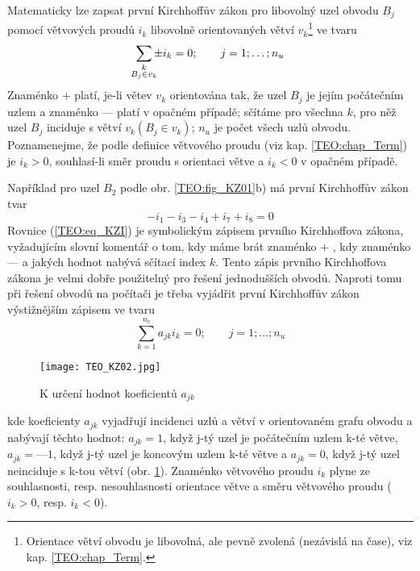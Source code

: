 {      Matematicky lze zapsat první Kirchhoffův zákon pro libovolný uzel obvodu \(B_j\) pomocí 
      větvových proudů \(i_k\) libovolně orientovaných větví \(v_k\)\footnote{Orientace větví 
      obvodu je libovolná, ale pevně zvolená (nezávislá na čase), viz kap. \ref{TEO:chap_Term}.} ve 
      tvaru 
      \cite[s.~47]{Meyer1978}
      \begin{equation}\label{TEO:eq_KZI}
        \sum_{\mathclap{\substack{k\\B_j\in v_k}}} \pm i_k = 0; \qquad j = 1;\ldots; n_u 
      \end{equation}
      Znaménko \(+\) platí, je-li větev \(v_k\) orientována tak, že uzel \(B_j\) je jejím 
      počátečním uzlem a znaménko \(—\) platí v opačném případě; sčítáme pro všechna \(k\), pro něž 
      uzel \(B_j\) inciduje s větví \(v_k (B_j\in v_k)\); \(n_u\) je počet všech uzlů obvodu. 
      Poznamenejme, že podle definice větvového proudu (viz kap. \ref{TEO:chap_Term}) je \(i_k > 
      0\), souhlasí-li směr proudu s orientaci větve a \(i_k < 0\) v opačném případě.
      
      Například pro uzel \(B_2\) podle obr. \ref{TEO:fig_KZ01}b) má první Kirchhoffův zákon tvar
      \begin{equation*}
        -i_1 - i_3 - i_4 + i_7 + i_8 = 0
      \end{equation*}
      Rovnice (\ref{TEO:eq_KZI}) je symbolickým zápisem prvního Kirchhoffova zákona, vyžadujícím 
      slovní komentář o tom, kdy máme brát znaménko \(+\) , kdy znaménko \(—\) a jakých hodnot 
      nabývá sčítací index \(k\). Tento zápis prvního Kirchhoffova zákona je velmi dobře použitelný 
      pro řešení jednodušších obvodů. Naproti tomu při řešení obvodů na počítači je třeba vyjádřit 
      první Kirchhoffův zákon výstižnějším zápisem ve tvaru
      \begin{equation}\label{TEO:eq_KZI_01}
        \sum\limits_{k=1}^{n_v} a_{jk} i_k = 0; \qquad j = 1;\ldots; n_u 
      \end{equation}
      \begin{figure}[ht!]
        \centering
        \texttt{[image: TEO\_KZ02.jpg]}
        \caption{K určení hodnot koeficientů \(a_{jk}\) \cite[s.~47]{Meyer1978}}
        \label{TEO:fig_KZ02}
      \end{figure}
      kde koeficienty \(a_{jk}\) vyjadřují incidenci uzlů a větví v orientovaném grafu obvodu a 
      nabývají těchto hodnot: \(a_{jk} = 1\), když j-tý uzel je počátečním uzlem k-té větve, 
      \(a_{jk} = — 1\), když j-tý uzel je koncovým uzlem k-té větve a \(a_{jk} = 0\), když j-tý 
      uzel neinciduje s k-tou větví (obr. \ref{TEO:fig_KZ02}). Znaménko větvového proudu \(i_k\) 
      plyne ze souhlasnosti, resp. nesouhlasnosti orientace větve a směru větvového proudu (\(i_k > 
      0\), resp. \(i_k < 0\)).
      
}

